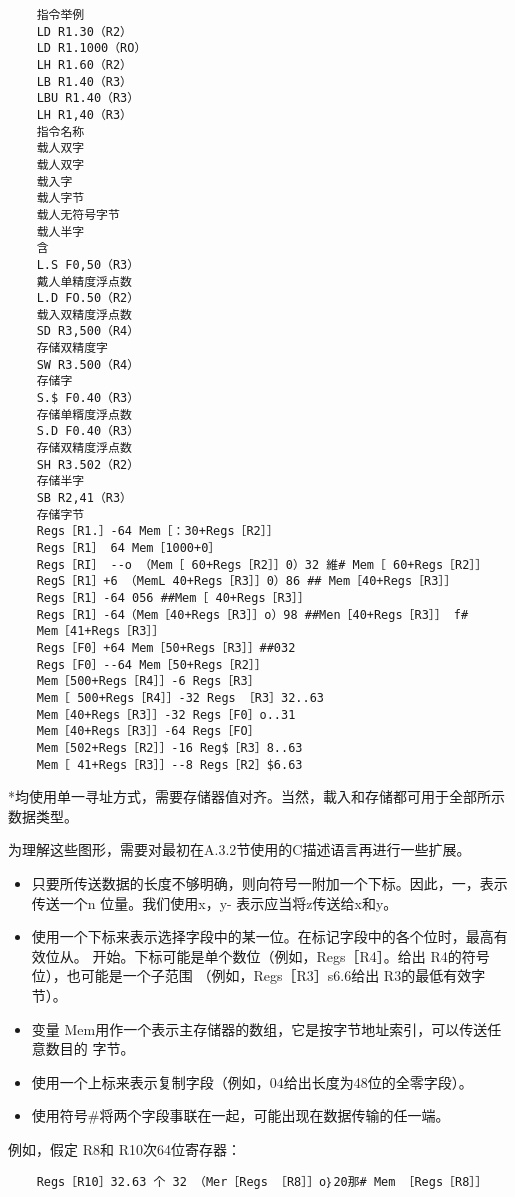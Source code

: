 \begin{verbatim}
    指令举例
    LD R1.30（R2）
    LD R1.1000（RO）
    LH R1.60（R2）
    LB R1.40（R3）
    LBU R1.40（R3）
    LH R1,40（R3）
    指令名称
    载人双字
    载人双字
    载入字
    载人字节
    载人无符号字节
    载人半字
    含
    L.S F0,50（R3）
    戴人单精度浮点数
    L.D FO.50（R2）
    载入双精度浮点数
    SD R3,500（R4）
    存储双精度字
    SW R3.500（R4）
    存储字
    S.$ F0.40（R3）
    存储单糈度浮点数
    S.D F0.40（R3）
    存储双精度浮点数
    SH R3.502（R2）
    存储半字
    SB R2,41（R3）
    存储字节
    Regs［R1.］-64 Mem［：30+Regs［R2］］
    Regs［R1］ 64 Mem［1000+0］
    Regs［RI］ --o （Mem［ 60+Regs［R2］］0）32 維# Mem［ 60+Regs［R2］］
    RegS［R1］+6 （MemL 40+Regs［R3］］0）86 ## Mem［40+Regs［R3］］
    Regs［R1］-64 056 ##Mem［ 40+Regs［R3］］
    Regs［R1］-64（Mem［40+Regs［R3］］o）98 ##Men［40+Regs［R3］］ f#
    Mem［41+Regs［R3］］
    Regs［F0］+64 Mem［50+Regs［R3］］##032
    Regs［F0］--64 Mem［50+Regs［R2］］
    Mem［500+Regs［R4］］-6 Regs［R3］
    Mem［ 500+Regs［R4］］-32 Regs ［R3］32..63
    Mem［40+Regs［R3］］-32 Regs［F0］o..31
    Mem［40+Regs［R3］］-64 Regs［FO］
    Mem［502+Regs［R2］］-16 Reg$［R3］8..63
    Mem［ 41+Regs［R3］］--8 Regs［R2］$6.63
\end{verbatim}
*均使用单一寻址方式，需要存储器值对齐。当然，載入和存储都可用于全部所示数据类型。

为理解这些图形，需要对最初在A.3.2节使用的C描述语言再进行一些扩展。

\begin{itemize}
    \item 只要所传送数据的长度不够明确，则向符号一附加一个下标。因此，一，表示传送一个n
    位量。我们使用x，y- 表示应当将z传送给x和y。
    \item 使用一个下标来表示选择字段中的某一位。在标记字段中的各个位时，最高有效位从。
    开始。下标可能是单个数位（例如，Regs［R4］。给出 R4的符号位），也可能是一个子范围
    （例如，Regs［R3］s6.6给出 R3的最低有效字节）。
    \item 变量 Mem用作一个表示主存储器的数组，它是按字节地址索引，可以传送任意数目的
    字节。
    \item 使用一个上标来表示复制字段（例如，04给出长度为48位的全零字段）。
    \item 使用符号\#将两个字段事联在一起，可能出现在数据传输的任一端。
\end{itemize}

例如，假定 R8和 R10次64位寄存器：
\begin{verbatim}
    Regs［R10］32.63 个 32 （Mer［Regs ［R8］］o｝20那# Mem ［Regs［R8］］
\end{verbatim}

